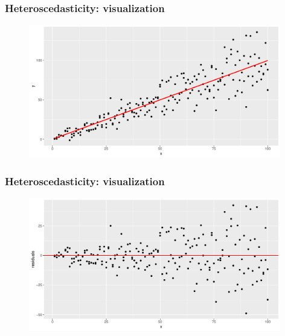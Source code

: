 \documentclass[xcolor=table,dvipsnames]{beamer}
\begin{document}
\begin{frame}
\frametitle{Heteroscedasticity: visualization}
\begin{figure}
\centering
\includegraphics[width=110mm]{pictures/week_18_het_1.pdf}
\end{figure}
\end{frame}

\begin{frame}
\frametitle{Heteroscedasticity: visualization}
\begin{figure}
\centering
\includegraphics[width=110mm]{pictures/week_18_het_2.pdf}
\end{figure}
\end{frame}
\end{document}
